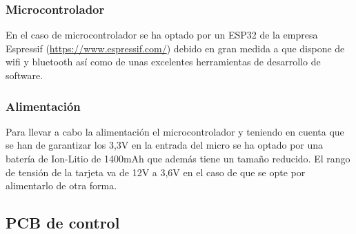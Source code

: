 \documentclass[a4paper ,12pt, onecolumn]{article}
\begin{document}
        \subsubsection{Microcontrolador} 
            En el caso de microcontrolador se ha optado por un ESP32 de la empresa Espressif (\url{https://www.espressif.com/})
            debido en gran medida a que dispone de wifi y bluetooth así como de unas excelentes herramientas
            de desarrollo de software. 
        \subsubsection{Alimentación} 
            Para llevar a cabo la alimentación el microcontrolador y teniendo en cuenta que se han de garantizar los 3,3V en la entrada
            del micro se ha optado por una batería de Ion-Litio de 1400mAh que además tiene un tamaño reducido. El rango de tensión de la
            tarjeta va de 12V a 3,6V en el caso de que se opte por alimentarlo de otra forma.
    \subsection{PCB de control}
\end{document}
